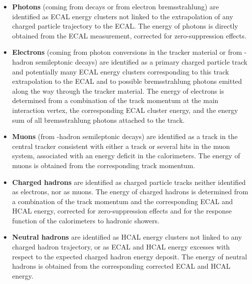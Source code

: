 \begin{itemize}
 \item \textbf{Photons}
(\eg coming from \Pgpz  decays or from electron bremsstrahlung) are identified as ECAL energy clusters not linked to the extrapolation of any charged particle trajectory to the ECAL. The energy of photons is directly obtained from the ECAL measurement, corrected for zero-suppression effects.

\item \textbf{Electrons} 
(\eg coming from photon conversions in the tracker material or from \cPqb-hadron semileptonic decays) are identified as a primary charged particle track and potentially many ECAL energy clusters corresponding to this track extrapolation to the ECAL and to possible bremsstrahlung photons emitted along the way through the tracker material. The energy of electrons is determined from a combination of the track momentum at the main interaction vertex, the corresponding ECAL cluster energy, and the energy sum of all bremsstrahlung photons attached to the track.

\item \textbf{Muons}
 (\eg from \cPqb-hadron semileptonic decays) are identified as a track in the central tracker consistent with either a track or several hits in the muon system, associated with an energy deficit in the calorimeters. The energy of muons is obtained from the corresponding track momentum.
 
\item \textbf{Charged hadrons} 
are identified as charged particle tracks neither identified as electrons, nor as muons. The energy of charged hadrons is determined from a combination of the track momentum and the corresponding ECAL and HCAL energy, corrected for zero-suppression effects and for the response function of the calorimeters to hadronic showers.

\item \textbf{Neutral hadrons}
are identified as HCAL energy clusters not linked to any charged hadron trajectory, or as ECAL and HCAL energy excesses with respect to the expected charged hadron energy deposit. The energy of neutral hadrons is obtained from the corresponding corrected ECAL and HCAL energy.
\end{itemize}

